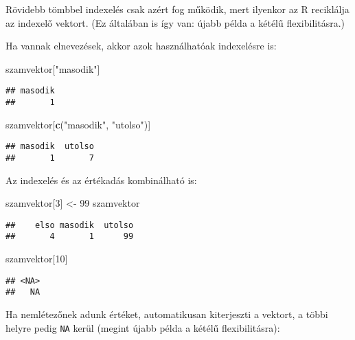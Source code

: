 \documentclass[
]{book}
\newenvironment{Shaded}{\begin{snugshade}}{\end{snugshade}}
\newcommand{\DecValTok}[1]{\textcolor[rgb]{0.00,0.00,0.81}{#1}}
\newcommand{\KeywordTok}[1]{\textcolor[rgb]{0.13,0.29,0.53}{\textbf{#1}}}
\newcommand{\NormalTok}[1]{#1}
\newcommand{\StringTok}[1]{\textcolor[rgb]{0.31,0.60,0.02}{#1}}
\begin{document}
Rövidebb tömbbel indexelés csak azért fog működik, mert ilyenkor az R reciklálja az indexelő vektort. (Ez általában is így van: újabb példa a kétélű flexibilitásra.)

Ha vannak elnevezések, akkor azok használhatóak indexelésre is:

\begin{Shaded}
\begin{Highlighting}[]
\NormalTok{szamvektor[}\StringTok{"masodik"}\NormalTok{]}
\end{Highlighting}
\end{Shaded}

\begin{verbatim}
## masodik 
##       1
\end{verbatim}

\begin{Shaded}
\begin{Highlighting}[]
\NormalTok{szamvektor[}\KeywordTok{c}\NormalTok{(}\StringTok{"masodik"}\NormalTok{, }\StringTok{"utolso"}\NormalTok{)]}
\end{Highlighting}
\end{Shaded}

\begin{verbatim}
## masodik  utolso 
##       1       7
\end{verbatim}

Az indexelés és az értékadás kombinálható is:

\begin{Shaded}
\begin{Highlighting}[]
\NormalTok{szamvektor[}\DecValTok{3}\NormalTok{] <-}\StringTok{ }\DecValTok{99}
\NormalTok{szamvektor}
\end{Highlighting}
\end{Shaded}

\begin{verbatim}
##    elso masodik  utolso 
##       4       1      99
\end{verbatim}

\begin{Shaded}
\begin{Highlighting}[]
\NormalTok{szamvektor[}\DecValTok{10}\NormalTok{]}
\end{Highlighting}
\end{Shaded}

\begin{verbatim}
## <NA> 
##   NA
\end{verbatim}

Ha nemlétezőnek adunk értéket, automatikusan kiterjeszti a vektort, a többi helyre pedig \texttt{NA} kerül (megint újabb példa a kétélű flexibilitásra):
\end{document}
